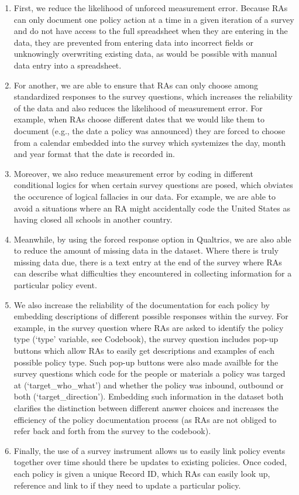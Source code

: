 \documentclass[
]{article}
\begin{document}
\begin{enumerate}
\def\labelenumi{\arabic{enumi}.}
\item
  First, we reduce the likelihood of unforced measurement error. Because RAs can only document one policy action at a time in a given iteration of a survey and do not have access to the full spreadsheet when they are entering in the data, they are prevented from entering data into incorrect fields or unknowingly overwriting existing data, as would be possible with manual data entry into a spreadsheet.
\item
  For another, we are able to ensure that RAs can only choose among standardized responses to the survey questions, which increases the reliability of the data and also reduces the likelihood of measurement error. For example, when RAs choose different dates that we would like them to document (e.g., the date a policy was announced) they are forced to choose from a calendar embedded into the survey which systemizes the day, month and year format that the date is recorded in.
\item
  Moreover, we also reduce measurement error by coding in different conditional logics for when certain survey questions are posed, which obviates the occurence of logical fallacies in our data. For example, we are able to avoid a situations where an RA might accidentally code the United States as having closed all schools in another country.
\item
  Meanwhile, by using the forced response option in Qualtrics, we are also able to reduce the amount of missing data in the dataset. Where there is truly missing data due, there is a text entry at the end of the survey where RAs can describe what difficulties they encountered in collecting information for a particular policy event.
\item
  We also increase the reliability of the documentation for each policy by embedding descriptions of different possible responses within the survey. For example, in the survey question where RAs are asked to identify the policy type (`type' variable, see Codebook), the survey question includes pop-up buttons which allow RAs to easily get descriptions and examples of each possible policy type. Such pop-up buttons were also made availble for the survey questions which code for the people or materials a policy was targed at (`target\_who\_what') and whether the policy was inbound, outbound or both (`target\_direction'). Embedding such information in the dataset both clarifies the distinction between different answer choices and increases the efficiency of the policy documentation process (as RAs are not obliged to refer back and forth from the survey to the codebook).
\item
  Finally, the use of a survey instrument allows us to easily link policy events together over time should there be updates to existing policies. Once coded, each policy is given a unique Record ID, which RAs can easily look up, reference and link to if they need to update a particular policy.
\end{enumerate}
\end{document}
